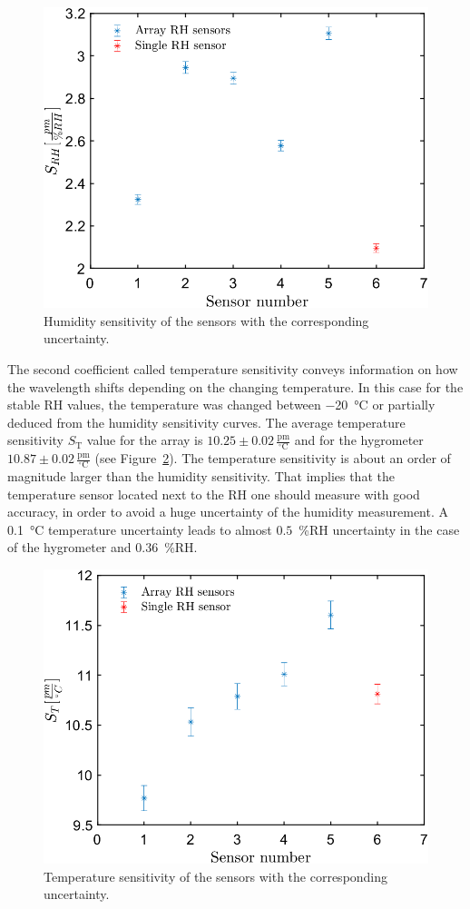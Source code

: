 \begin{figure}[!h]
\centering
\includegraphics[width=0.6\columnwidth]{Chapter5/images/comp1.png}
\caption{Humidity sensitivity of the sensors with the corresponding uncertainty.}
\label{fig_calibration}
\end{figure}
The second coefficient called temperature sensitivity conveys information on how the wavelength shifts depending on the changing temperature. In this case for the stable \gls{RH} values, the temperature was changed between \SI{-20}{\celsius} or partially deduced from the humidity sensitivity curves. 
The average temperature sensitivity $S_\text{T}$ value for the array is $10.25\pm0.02\,\mathrm{\frac{pm}{^{\circ}C}}$ and for the hygrometer $10.87\pm 0.02\,\mathrm{\frac{pm}{^{\circ}C}}$ (see Figure~\ref{fig_calibration1}). The temperature sensitivity is about an order of magnitude larger than the humidity sensitivity. That implies that the temperature sensor located next to the \gls{RH} one should measure with good accuracy, in order to avoid a huge uncertainty of the humidity measurement. A \SI{0.1}{\celsius} temperature uncertainty leads to almost $0.5$~\%RH uncertainty in the case of the hygrometer and $0.36$~\%RH. 
\begin{figure}[!h]
\centering
\includegraphics[width=0.6\columnwidth]{Chapter5/images/comp.png}
\caption{Temperature sensitivity of the sensors with the corresponding uncertainty.}
\label{fig_calibration1}
\end{figure}

